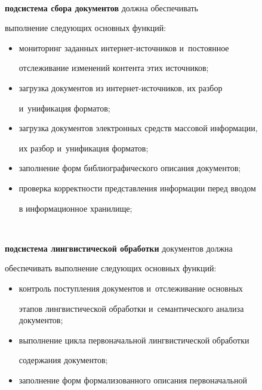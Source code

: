 \begin{description}
     


    \item[\,] \textbf{подсистема сбора документов} должна обеспечивать 


выполнение следующих основных функций:


     \begin{itemize}


     \item мониторинг заданных интернет-источников и~постоянное 


отслеживание изменений контента этих источников;


     \item загрузка документов из интернет-источников, их разбор 


и~унификация форматов;


     \item загрузка документов электронных средств массовой информации, 


их разбор и~унификация форматов;


     \item заполнение форм библиографического описания документов; 


     \item проверка корректности представления информации перед вводом 


в информационное хранилище;


     \end{itemize}


     


    \item[\,] \textbf{подсистема лингвистической обработки} документов должна 


обеспечивать выполнение следующих основных функций:


     \begin{itemize}


     \item контроль поступления документов и~отслеживание основных 


этапов лингвистической обработки и~семантического анализа документов;


     \item выполнение цикла первоначальной лингвистической обработки 


содержания документов;


     \item заполнение форм формализованного описания первоначальной 



\end{itemize}
\end{description}
